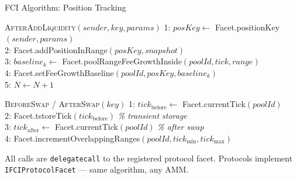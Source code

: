 \documentclass[aspectratio=169]{beamer}
\newcommand{\PosCount}{N}
\begin{document}
\begin{frame}{FCI Algorithm: Position Tracking}

\begin{block}{\textsc{AfterAddLiquidity}$(sender, key, params)$}
\ttfamily\small
1: $posKey \gets$ Facet.positionKey$(sender, params)$ \\
2: Facet.addPositionInRange$(posKey, snapshot)$ \\
3: $baseline_k \gets$ Facet.poolRangeFeeGrowthInside$(poolId, tick, range)$ \\
4: Facet.setFeeGrowthBaseline$(poolId, posKey, baseline_k)$ \\
5: $\PosCount \gets \PosCount + 1$
\end{block}

\begin{block}{\textsc{BeforeSwap / AfterSwap}$(key)$}
\ttfamily\small
1: $tick_{\text{before}} \gets$ Facet.currentTick$(poolId)$ \\
2: Facet.tstoreTick$(tick_{\text{before}})$ \hfill\textrm{\itshape\% transient storage} \\
3: $tick_{\text{after}} \gets$ Facet.currentTick$(poolId)$ \hfill\textrm{\itshape\% after swap} \\
4: Facet.incrementOverlappingRanges$(poolId, tick_{\min}, tick_{\max})$
\end{block}

\medskip

{\footnotesize All calls are \texttt{delegatecall} to the registered protocol facet.
Protocols implement \texttt{IFCIProtocolFacet} --- same algorithm, any AMM.}

\end{frame}
\end{document}
